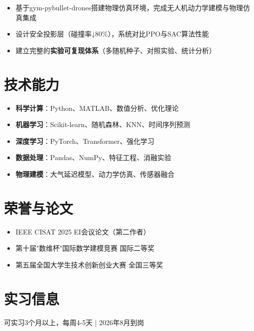 \documentclass{resume}
\begin{document}
\begin{itemize}
  \item 基于gym-pybullet-drones搭建物理仿真环境，完成无人机动力学建模与物理仿真集成
  \item 设计安全投影层（碰撞率↓80\%），系统对比PPO与SAC算法性能
  \item 建立完整的\textbf{实验可复现体系}（多随机种子、对照实验、统计分析）
\end{itemize}

\section{技术能力}
\begin{itemize}
  \item \textbf{科学计算}：Python、MATLAB、数值分析、优化理论
  \item \textbf{机器学习}：Scikit-learn、随机森林、KNN、时间序列预测
  \item \textbf{深度学习}：PyTorch、Transformer、强化学习
  \item \textbf{数据处理}：Pandas、NumPy、特征工程、消融实验
  \item \textbf{物理建模}：大气延迟模型、动力学仿真、传感器融合
\end{itemize}

\section{荣誉与论文}
\begin{itemize}
  \item IEEE CISAT 2025 EI会议论文（第二作者）
  \item 第十届"数维杯"国际数学建模竞赛 国际二等奖
  \item 第五届全国大学生技术创新创业大赛 全国三等奖
\end{itemize}

\section{实习信息}
可实习3个月以上，每周4-5天 | 2026年8月到岗
\end{document}
